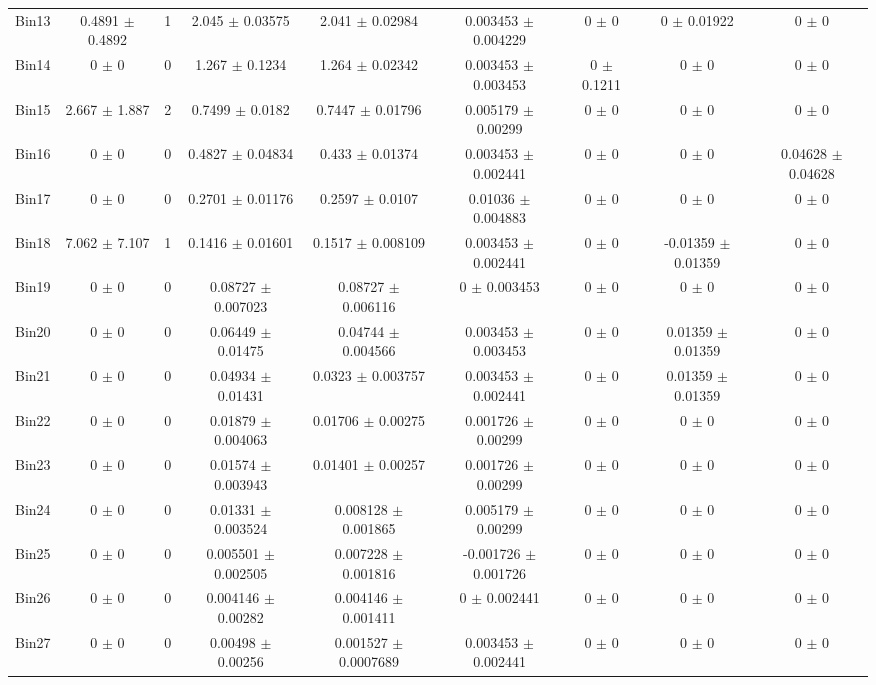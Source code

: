 \begin{tabular}{@{\extracolsep{4pt}}lcccccccc@{}}
     Bin13 & 0.4891 $\pm$ 0.4892 & 1 & 2.045 $\pm$ 0.03575 & 2.041 $\pm$ 0.02984 & 0.003453 $\pm$ 0.004229 & 0 $\pm$ 0 & 0 $\pm$ 0.01922 & 0 $\pm$ 0 \\ 
     Bin14 & 0 $\pm$ 0 & 0 & 1.267 $\pm$ 0.1234 & 1.264 $\pm$ 0.02342 & 0.003453 $\pm$ 0.003453 & 0 $\pm$ 0.1211 & 0 $\pm$ 0 & 0 $\pm$ 0 \\ 
     Bin15 & 2.667 $\pm$ 1.887 & 2 & 0.7499 $\pm$ 0.0182 & 0.7447 $\pm$ 0.01796 & 0.005179 $\pm$ 0.00299 & 0 $\pm$ 0 & 0 $\pm$ 0 & 0 $\pm$ 0 \\ 
     Bin16 & 0 $\pm$ 0 & 0 & 0.4827 $\pm$ 0.04834 & 0.433 $\pm$ 0.01374 & 0.003453 $\pm$ 0.002441 & 0 $\pm$ 0 & 0 $\pm$ 0 & 0.04628 $\pm$ 0.04628 \\ 
     Bin17 & 0 $\pm$ 0 & 0 & 0.2701 $\pm$ 0.01176 & 0.2597 $\pm$ 0.0107 & 0.01036 $\pm$ 0.004883 & 0 $\pm$ 0 & 0 $\pm$ 0 & 0 $\pm$ 0 \\ 
     Bin18 & 7.062 $\pm$ 7.107 & 1 & 0.1416 $\pm$ 0.01601 & 0.1517 $\pm$ 0.008109 & 0.003453 $\pm$ 0.002441 & 0 $\pm$ 0 & -0.01359 $\pm$ 0.01359 & 0 $\pm$ 0 \\ 
     Bin19 & 0 $\pm$ 0 & 0 & 0.08727 $\pm$ 0.007023 & 0.08727 $\pm$ 0.006116 & 0 $\pm$ 0.003453 & 0 $\pm$ 0 & 0 $\pm$ 0 & 0 $\pm$ 0 \\ 
     Bin20 & 0 $\pm$ 0 & 0 & 0.06449 $\pm$ 0.01475 & 0.04744 $\pm$ 0.004566 & 0.003453 $\pm$ 0.003453 & 0 $\pm$ 0 & 0.01359 $\pm$ 0.01359 & 0 $\pm$ 0 \\ 
     Bin21 & 0 $\pm$ 0 & 0 & 0.04934 $\pm$ 0.01431 & 0.0323 $\pm$ 0.003757 & 0.003453 $\pm$ 0.002441 & 0 $\pm$ 0 & 0.01359 $\pm$ 0.01359 & 0 $\pm$ 0 \\ 
     Bin22 & 0 $\pm$ 0 & 0 & 0.01879 $\pm$ 0.004063 & 0.01706 $\pm$ 0.00275 & 0.001726 $\pm$ 0.00299 & 0 $\pm$ 0 & 0 $\pm$ 0 & 0 $\pm$ 0 \\ 
     Bin23 & 0 $\pm$ 0 & 0 & 0.01574 $\pm$ 0.003943 & 0.01401 $\pm$ 0.00257 & 0.001726 $\pm$ 0.00299 & 0 $\pm$ 0 & 0 $\pm$ 0 & 0 $\pm$ 0 \\ 
     Bin24 & 0 $\pm$ 0 & 0 & 0.01331 $\pm$ 0.003524 & 0.008128 $\pm$ 0.001865 & 0.005179 $\pm$ 0.00299 & 0 $\pm$ 0 & 0 $\pm$ 0 & 0 $\pm$ 0 \\ 
     Bin25 & 0 $\pm$ 0 & 0 & 0.005501 $\pm$ 0.002505 & 0.007228 $\pm$ 0.001816 & -0.001726 $\pm$ 0.001726 & 0 $\pm$ 0 & 0 $\pm$ 0 & 0 $\pm$ 0 \\ 
     Bin26 & 0 $\pm$ 0 & 0 & 0.004146 $\pm$ 0.00282 & 0.004146 $\pm$ 0.001411 & 0 $\pm$ 0.002441 & 0 $\pm$ 0 & 0 $\pm$ 0 & 0 $\pm$ 0 \\ 
     Bin27 & 0 $\pm$ 0 & 0 & 0.00498 $\pm$ 0.00256 & 0.001527 $\pm$ 0.0007689 & 0.003453 $\pm$ 0.002441 & 0 $\pm$ 0 & 0 $\pm$ 0 & 0 $\pm$ 0 \\ 

\end{tabular}
